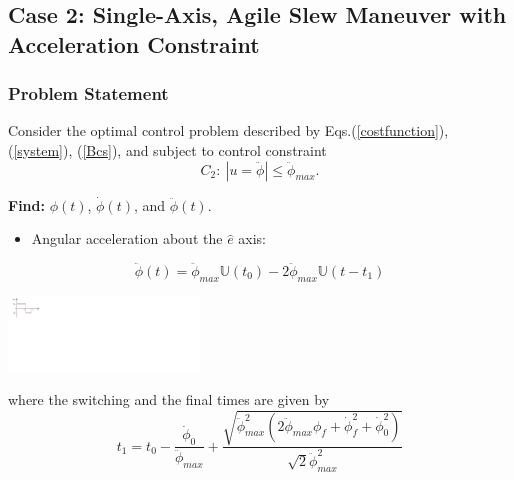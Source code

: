 \documentclass[letterpaper, preprint, paper,11pt]{AAS}	%
\begin{document}
	
	\subsection{Case 2: Single-Axis, Agile Slew Maneuver with Acceleration Constraint} 
	
	\subsubsection{Problem Statement} 
	
	Consider the optimal control problem described by Eqs.(\ref{costfunction}), (\ref{system}), (\ref{Bcs}), and subject to control constraint
	\begin{equation}
	C_2: \ |u=\ddot{\phi}|\leq \ddot{\phi}_{max}.
	\end{equation}
	
	{\bf Find:} $\phi(t)$, $\dot{\phi}(t)$, and $\ddot{\phi}(t)$.
	
	
	\begin{itemize}
		\item Angular acceleration about the $\hat{e}$ axis:
	\end{itemize}
	\begin{equation}\label{alpha}
	\ddot{\phi}(t)=\ddot{\phi}_{max}\mathbb{U}(t_0)- 2\ddot{\phi}_{max}\mathbb{U}(t-t_1)
	\end{equation}
	
	\begin{center}
		\includegraphics[width=2in]{./Figures/Bang_bang}      
	\end{center}
	
	where the switching and the final times are given by
	\begin{equation}
	t_1=t_0-\frac{\dot{\phi}_{0}}{\ddot{\phi}_{max}}+\frac{\sqrt{\ddot{\phi}_{max}^2(2\ddot{\phi}_{max}\phi_{f}+\dot{\phi}_{f}^2+\dot{\phi}_{0}^2)}}{\sqrt{2}\ddot{\phi}_{max}^2}
	\end{equation}
	
\end{document}

